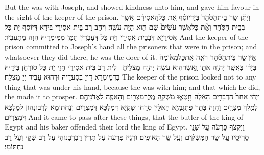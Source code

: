 {But the \lord\space was with Joseph, and showed kindness unto him, and gave him favour in the sight of the keeper of the prison.}{}
{וַיִּתֵּ֞ן שַׂ֤ר בֵּית\maqqaf הַסֹּ֙הַר֙ בְּיַד\maqqaf יוֹסֵ֔ף אֵ֚ת כׇּל\maqqaf הָ֣אֲסִירִ֔ם אֲשֶׁ֖ר בְּבֵ֣ית הַסֹּ֑הַר וְאֵ֨ת כׇּל\maqqaf אֲשֶׁ֤ר עֹשִׂים֙ שָׁ֔ם ה֖וּא הָיָ֥ה עֹשֶֽׂה׃}
{וִיהַב רַב בֵּית אֲסִירֵי בִּידָא דְּיוֹסֵף יָת כָּל אֲסִירַיָּא דִּבְבֵּית אֲסִירֵי וְיָת כָּל דְּעָבְדִין תַּמָּן מִמֵּימְרֵיהּ הֲוָה מִתְעֲבֵיד׃}
{And the keeper of the prison committed to Joseph’s hand all the prisoners that were in the prison; and whatsoever they did there, he was the doer of it.}{}
{אֵ֣ין \legarmeh  שַׂ֣ר בֵּית\maqqaf הַסֹּ֗הַר רֹאֶ֤ה אֶֽת\maqqaf כׇּל\maqqaf מְא֙וּמָה֙ בְּיָד֔וֹ בַּאֲשֶׁ֥ר יְהֹוָ֖ה אִתּ֑וֹ וַֽאֲשֶׁר\maqqaf ה֥וּא עֹשֶׂ֖ה יְהֹוָ֥ה מַצְלִֽיחַ׃ \petucha }
{לֵית רַב בֵּית אֲסִירֵי חָזֵי יָת כָּל סוּרְחָן בִּידֵיהּ בִּדְמֵימְרָא דַּייָ בְּסַעֲדֵיהּ וּדְהוּא עָבֵיד יְיָ מַצְלַח׃}
{The keeper of the prison looked not to any thing that was under his hand, because the \lord\space was with him; and that which he did, the \lord\space made it to prosper.}{}
\newperek
{}
{וַיְהִ֗י אַחַר֙ הַדְּבָרִ֣ים הָאֵ֔לֶּה חָ֥טְא֛וּ מַשְׁקֵ֥ה מֶֽלֶךְ\maqqaf מִצְרַ֖יִם וְהָאֹפֶ֑ה לַאֲדֹנֵיהֶ֖ם לְמֶ֥לֶךְ מִצְרָֽיִם׃}
{וַהֲוָה בָּתַר פִּתְגָמַיָּא הָאִלֵּין סְרַחוּ שָׁקְיָא דְּמַלְכָּא דְּמִצְרַיִם וְנַחְתּוֹמָא לְרִבּוֹנְהוֹן לְמַלְכָּא דְּמִצְרָיִם׃}
{And it came to pass after these things, that the butler of the king of Egypt and his baker offended their lord the king of Egypt.}{}
{וַיִּקְצֹ֣ף פַּרְעֹ֔ה עַ֖ל שְׁנֵ֣י סָרִיסָ֑יו עַ֚ל שַׂ֣ר הַמַּשְׁקִ֔ים וְעַ֖ל שַׂ֥ר הָאוֹפִֽים׃}
{וּרְגֵיז פַּרְעֹה עַל תְּרֵין רַבְרְבָנוֹהִי עַל רַב שָׁקֵי וְעַל רַב נַחְתּוֹמֵי׃}
